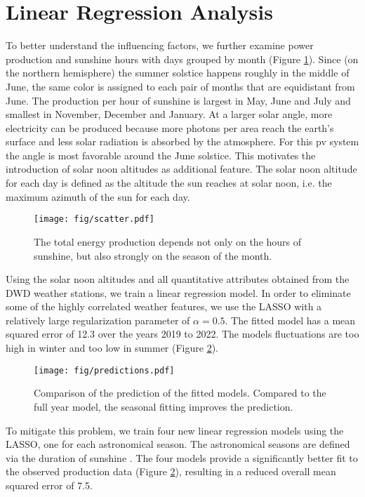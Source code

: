 \documentclass{article}
\begin{document}
\section{Linear Regression Analysis}
To better understand the influencing factors, we further examine power production and sunshine hours with days grouped by month (Figure \ref{fig:scatter_months}). Since (on the northern hemisphere) the summer solstice happens roughly in the middle of June, the same color is assigned to each pair of months that are equidistant from June. The production per hour of sunshine is largest in May, June and July and smallest in November, December and January. At a larger solar angle, more electricity can be produced because more photons per area reach the earth's surface and less solar radiation is absorbed by the atmosphere. For this pv system the angle is most favorable around the June solstice. This motivates the introduction of solar noon altitudes as additional feature. The solar noon altitude for each day is defined as the altitude the sun reaches at solar noon, i.e. the maximum azimuth of the sun for each day. 

\begin{figure}[H]
	\texttt{[image: fig/scatter.pdf]}
	\caption{The total energy production depends not only on the hours of sunshine, but also strongly on the season of the month.}\label{fig:scatter_months}
\end{figure}

Using the solar noon altitudes and all quantitative attributes obtained from the DWD weather stations, we train a linear regression model. In order to eliminate some of the highly correlated weather features, we use the LASSO with a relatively large regularization parameter of $\alpha = 0.5$. The fitted model has a mean squared error of 12.3 over the years 2019 to 2022. The models fluctuations are too high in winter and too low in summer (Figure \ref{fig:predictions}).

\begin{figure}[H]
	\texttt{[image: fig/predictions.pdf]}
	\caption{Comparison of the prediction of the fitted models. Compared to the full year model, the seasonal fitting improves the prediction.}\label{fig:predictions}
\end{figure}

To mitigate this problem, we train four new linear regression models using the LASSO, one for each astronomical season. The astronomical seasons are defined via the duration of sunshine \cite{MS}. The four models provide a significantly better fit to the observed production data (Figure \ref{fig:predictions}), resulting in a reduced overall mean squared error of 7.5.
\end{document}
